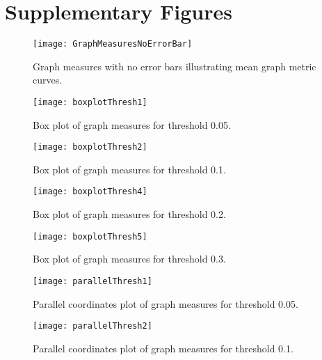\chapter{Supplementary Figures}
\label{appendix:extra-figures}

	\begin{figure}
	    \centering
	    \captionsetup{justification=centering}
	    \begin{adjustwidth}{-5em}{-2em}
	    \centering
	    \texttt{[image: GraphMeasuresNoErrorBar]}
	    \end{adjustwidth}
	    \caption{Graph measures with no error bars illustrating mean graph metric curves.}
	    \label{fig:graphmeasure-noerror}
	\end{figure}

	\begin{figure}
			\centering
		    \texttt{[image: boxplotThresh1]}
		    \caption{Box plot of graph measures for threshold 0.05.}
		    \label{fig:boxPlot1}
	\end{figure}
	
	\begin{figure}
			\centering
		    \texttt{[image: boxplotThresh2]}
		    \caption{Box plot of graph measures for threshold 0.1.}
		    \label{fig:boxPlot2}
		\end{figure}
	
	\begin{figure}
		\centering
	    \texttt{[image: boxplotThresh4]}
	    \caption{Box plot of graph measures for threshold 0.2.}
	    \label{fig:boxPlot4}
	\end{figure}

	\begin{figure}
			\centering
		    \texttt{[image: boxplotThresh5]}
		    \caption{Box plot of graph measures for threshold 0.3.}
		    \label{fig:boxPlot5}
	\end{figure}

	\begin{figure}
			\centering
		    \texttt{[image: parallelThresh1]}
		    \caption{Parallel coordinates plot of graph measures for threshold 0.05.}
		    \label{fig:parallelPlot1}
	\end{figure}
	
	\begin{figure}
			\centering
		    \texttt{[image: parallelThresh2]}
		    \caption{Parallel coordinates plot of graph measures for threshold 0.1.}
		    \label{fig:parallelPlot2}
		\end{figure}
	
